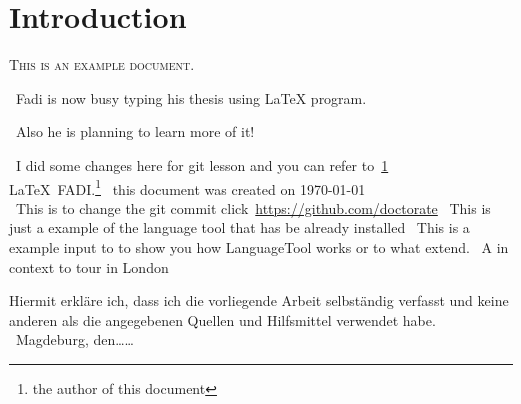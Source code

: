 \documentclass[12pt,a4,toc=graduated]{scrreprt} %
\begin{document}
\chapter{Introduction}
\label{ch:intro}
\textsc{This is an example document.}\par 
\ Fadi is now busy typing his thesis using LaTeX program.\par
\ Also he is planning to learn more of it!\par
\ I did some changes here for git lesson and you can refer to~\ref{ch:intro}\\
\LaTeX\ {FADI.}\footnote{the author of this document}
\ this document was created on \today\\
\ This is to change the git commit click~\url{https://github.com/doctorate}
\ This is just a example of the  language tool that has be already installed 
\ This is a example input to to show you how LanguageTool works or to what extend.
\ A in context to  tour in London
\par
Hiermit erkl\"are ich, dass ich die vorliegende Arbeit selbst\"andig verfasst und keine anderen als die angegebenen Quellen und Hilfsmittel verwendet habe.\\
\ Magdeburg, den\ldots\ldots
%
\end{document}

